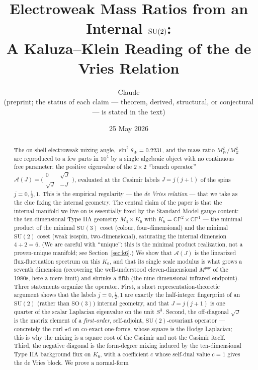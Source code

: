 \documentclass[11pt]{article}
\title{\bf Electroweak Mass Ratios from an Internal $\SU(2)$:\\[2mm]
A Kaluza--Klein Reading of the de Vries Relation}
\author{Claude\\[1mm]
\small (preprint; the status of each claim --- theorem, derived, structural,
or conjectural --- is stated in the text)}
\date{25 May 2026}
\theoremstyle{plain}
\theoremstyle{definition}
\newcommand{\cA}{\mathcal{A}}
\newcommand{\half}{\tfrac12}
\newcommand{\sinsq}{\sin^{2}\theta_W}
\newcommand{\dd}{\mathrm{d}}
\newcommand{\SU}{\mathrm{SU}}
\newcommand{\SO}{\mathrm{SO}}
\begin{document}
\maketitle

\begin{abstract}
\noindent
The on-shell electroweak mixing angle, $\sinsq=0.2231$, and the
mass ratio $M_W^2/M_Z^2$ are reproduced to a few parts in $10^{4}$ by a
single algebraic object with no continuous free parameter: the positive
eigenvalue of the $2\times2$ ``branch operator''
$\cA(J)=\bigl(\begin{smallmatrix}0&\sqrt J\\ \sqrt J&-J\end{smallmatrix}\bigr)$,
evaluated at the Casimir labels $J=j(j+1)$ of the spins $j=0,\half,1$.
This is the empirical regularity --- the \emph{de Vries relation} --- that
we take as the clue fixing the internal geometry. The central claim of the
paper is that the internal manifold we live on is essentially fixed by the
Standard Model gauge content: the ten-dimensional Type IIA geometry
$M_4\times K_6$ with $K_6=\mathbb{CP}^2\times\mathbb{CP}^1$ --- the minimal
product of the minimal $\SU(3)$ coset (colour, four-dimensional) and the
minimal $\SU(2)$ coset (weak isospin, two-dimensional), saturating the
internal dimension $4+2=6$. (We are careful with ``unique'': this is the
minimal product realization, not a proven-unique manifold; see
Section~\ref{sec:k6}.)
We show that $\cA(J)$ is the linearized flux-fluctuation spectrum on this
$K_6$, and that its single scale modulus is what grows a seventh
dimension (recovering the well-understood eleven-dimensional $M^{pqr}$ of the
1980s, here a mere limit) and shrinks a fifth (the nine-dimensional infrared
endpoint). Three statements organize the operator. First, a
short representation-theoretic argument shows that the labels $j=0,\half,1$
are exactly the half-integer fingerprint of an $\SU(2)$ (rather than
$\SO(3)$) internal geometry, and that $J=j(j+1)$ is one quarter of the
scalar Laplacian eigenvalue on the unit $S^3$. Second, the off-diagonal
$\sqrt J$ is the matrix element of a \emph{first-order}, self-adjoint,
$\SU(2)$-covariant operator --- concretely the curl $\star\dd$ on
co-exact one-forms, whose square is the Hodge Laplacian; this is why the
mixing is a square root of the Casimir and not the Casimir itself. Third,
the negative diagonal is the form-degree mixing induced by the
ten-dimensional Type IIA background flux on $K_6$, with a coefficient $c$
whose self-dual value $c=1$ gives the de Vries block. We prove a normal-form

\end{abstract}
\end{document}

